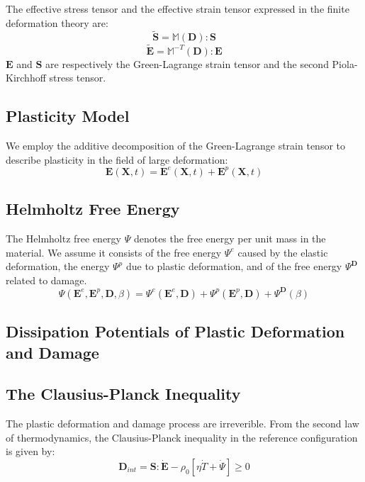 \documentclass[11pt,fullpage]{article}
\begin{document}
The effective stress tensor and the effective strain tensor expressed
in the finite deformation theory are:
$$
\tilde{\bm{S}} = \mathbb{M}(\bm{D}):\bm{S}
$$
$$
\tilde{\bm{E}} = \mathbb{M}^{-T}(\bm{D}):\bm{E}
$$
$\bm{E}$ and $\bm{S}$ are respectively the Green-Lagrange strain
tensor and the second Piola-Kirchhoff stress tensor.

\subsection{Plasticity Model}

We employ the additive decomposition of the Green-Lagrange strain tensor
to describe plasticity in the field of large deformation:
$$
\bm{E}(\bm{X},t) = \bm{E}^e(\bm{X},t)+\bm{E}^p(\bm{X},t)
$$

\subsection{Helmholtz Free Energy}

The Helmholtz free energy $\Psi$ denotes the free energy per unit mass
in the material. We assume it consists of the free energy
$\Psi^{e}$ caused by the elastic deformation, the energy
$\Psi^{p}$ due to plastic deformation, and of the free energy
$\Psi^{\bm{D}}$ related to damage.
$$
\Psi(\bm{E}^e,\bm{E}^p,\bm{D},\beta) = \Psi^{e}(\bm{E}^e,\bm{D}) + \Psi^{p}(\bm{E}^p,\bm{D}) + \Psi^{\bm{D}}(\beta)
$$

\subsection{Dissipation Potentials of Plastic Deformation and Damage}

\subsection{The Clausius-Planck Inequality}

The plastic deformation and damage process are irreverible. From the second law of thermodynamics, the Clausius-Planck inequality in the reference configuration is given by:
$$
\bm{D}_{int} = \bm{S}:\dot{\bm{E}} - \rho_0[\eta\dot{T}+\dot{\Psi}] \geq 0
$$



\end{document}
